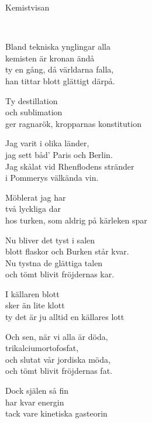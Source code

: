 \begin{song}{Kemistvisan}
	
	
	\\

    \showversenumber	
	Bland tekniska ynglingar alla\\
	kemisten är kronan ändå\\
	ty en gång, då världarna falla,\\
	han tittar blott glättigt därpå.\\
	\begin{repetition}
		Ty destillation\\
		och sublimation\\
		ger ragnarök, kropparnas konstitution
	\end{repetition}
	
    \showversenumber
	Jag varit i olika länder,\\
	jag sett båd' Paris och Berlin.\\
	Jag skålat vid Rhenflodens stränder\\
	i Pommerys välkända vin.\\
	\begin{repetition}
		Möblerat jag har\\
		två lyckliga dar\\
		hos turken, som aldrig på kärleken spar
	\end{repetition}
	
    \showversenumber
	Nu bliver det tyst i salen\\
	blott flaskor och Burken står kvar.\\
	Nu tystna de glättiga talen\\
	och tömt blivit fröjdernas kar.\\
	\begin{repetition}
		I källaren blott\\
		sker än lite klott\\
		ty det är ju alltid en källares lott
	\end{repetition}
	
    \showversenumber
	Och sen, när vi alla är döda,\\
	trikalciumortofosfat,\\
	och slutat vår jordiska möda,\\
	och tömt blivit fröjdernas fat.\\
	\begin{repetition}
		Dock själen så fin\\
		har kvar energin\\
		tack vare kinetiska gasteorin
	\end{repetition}
	
\end{song}
